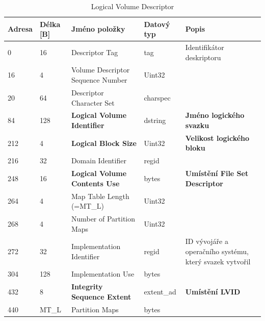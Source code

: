 \begin{table}[]
    \centering
    \begin{tabular}{ | l | l | p{4.2cm} | p{1.8cm} | p{5.5cm} | }
        \hline
        Adresa  & Délka [B]   & Jméno položky & Datový typ    & Popis \\ \hline\hline
        0   &16     & Descriptor Tag                    & tag           & Identifikátor deskriptoru \\ \hline
        16  &4      & Volume Descriptor Sequence Number & Uint32        &  \\ \hline
        20  &64     & Descriptor Character Set          & charspec      &  \\ \hline
        84  &128    & \textbf{Logical Volume Identifier}& dstring       & \textbf{Jméno logického svazku} \\ \hline
        212 &4      &\textbf{Logical Block Size}        & Uint32        & \textbf{Velikost logického bloku} \\ \hline
        216 &32     &Domain Identifier                  & regid         &  \\ \hline
        248 &16     &\textbf{Logical Volume Contents Use}& bytes         & \textbf{Umístění \textbf{File Set Descriptor}}\\ \hline
        264 &4      &Map Table Length (=MT\_L)          & Uint32        & \\ \hline
        268 &4      &Number of Partition Maps           & Uint32        & \\ \hline
        272 &32     &Implementation Identifier          & regid         & ID vývojáře a operačního systému, který svazek vytvořil \\ \hline
        304 &128    &Implementation Use                 & bytes         & \\ \hline
        432 &8      &\textbf{Integrity Sequence Extent} & extent\_ad    & \textbf{Umístění LVID} \\ \hline
        440 &MT\_L  &Partition Maps                     & bytes         & \\ \hline
    \end{tabular}
    \caption{Logical Volume Descriptor\label{tab:lvd}}
\end{table}

